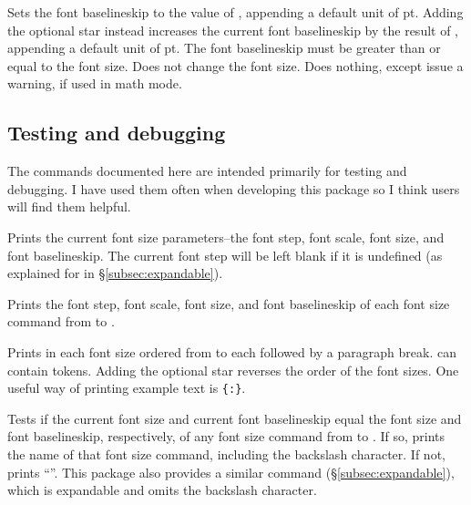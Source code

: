 \documentclass{beery}
\begin{document}
Sets the font baselineskip to the value of , appending a default unit of \unit{pt}.
Adding the optional star instead increases the current font baselineskip by the result of , appending a default unit of \unit{pt}.
The font baselineskip must be greater than or equal to the font size.
Does not change the font size.
Does nothing, except issue a warning, if used in math mode.

\subsection{Testing and debugging}
\label{subsec:debug}

The commands documented here are intended primarily for testing and debugging.
I have used them often when developing this package so I think users will find them helpful.

\KeepNextPar*

Prints the current font size parameters\---the font step, font scale, font size, and font baselineskip.
The current font step will be left blank if it is undefined (as explained for  in \S\ref{subsec:expandable}).

\KeepNextPar*

Prints the font step, font scale, font size, and font baselineskip of each font size command from  to .

 \sarg{} 
\KeepNextPar*

Prints  in each font size ordered from  to  each followed by a paragraph break.
 can contain  tokens.
Adding the optional star reverses the order of the font sizes.
One useful way of printing example text is \allowbreak\texttt{\{:\allowbreak\textvisiblespace\allowbreak{}\}}.

\KeepNextPar*

Tests if the current font size and current font baselineskip equal the font size and font baselineskip, respectively, of any font size command from  to .
If so, prints the name of that font size command, including the backslash character.
If not, prints \enquote{\string\undefined}.
This package also provides a similar command  (\S\ref{subsec:expandable}), which is expandable and omits the backslash character.
\end{document}
